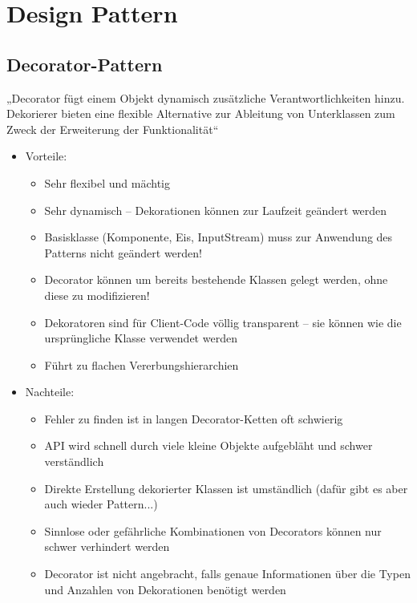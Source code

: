  \section{Design Pattern}
\subsection{Decorator-Pattern}
„Decorator fügt einem Objekt dynamisch zusätzliche Verantwortlichkeiten hinzu. Dekorierer bieten eine flexible Alternative zur Ableitung von Unterklassen zum Zweck der Erweiterung der Funktionalität“

\begin{itemize}
	\item Vorteile:
	\begin{itemize}
\item Sehr flexibel und mächtig
\item Sehr dynamisch – Dekorationen können zur Laufzeit geändert werden
\item Basisklasse (Komponente, Eis, InputStream) muss zur Anwendung des Patterns nicht geändert werden!
\item Decorator können um bereits bestehende Klassen gelegt werden, ohne diese zu modifizieren!
\item Dekoratoren sind für Client-Code völlig transparent – sie können wie die ursprüngliche Klasse verwendet werden
\item Führt zu flachen Vererbungshierarchien
	\end{itemize}
	\item Nachteile:
	\begin{itemize}
\item Fehler zu finden ist in langen Decorator-Ketten oft schwierig
\item API wird schnell durch viele kleine Objekte aufgebläht und schwer verständlich
\item Direkte Erstellung dekorierter Klassen ist umständlich (dafür gibt es aber auch wieder Pattern...)
\item  Sinnlose oder gefährliche Kombinationen von Decorators können nur schwer verhindert werden
\item Decorator ist nicht angebracht, falls genaue Informationen über die Typen und Anzahlen von Dekorationen benötigt werden
	\end{itemize}
\end{itemize}
%
%
%
